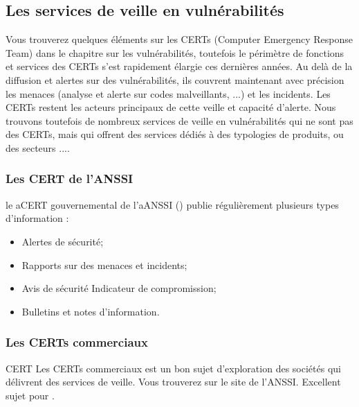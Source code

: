 \uchap{\jobname}

\subsection{Les services de veille en vulnérabilités}

Vous trouverez quelques éléments sur les CERTs (Computer Emergency Response Team) dans le chapitre sur les vulnérabilités, toutefois le périmètre de fonctions et services des CERTs s'est rapidement élargie ces dernières années. Au delà de la diffusion et alertes sur des vulnérabilités, ils couvrent maintenant avec précision les menaces (analyse et alerte sur codes malveillants, ...) et les incidents. Les CERTs restent les acteurs principaux de cette veille et capacité d'alerte.  
Nous trouvons toutefois de nombreux services de veille en vulnérabilités qui ne sont pas des CERTs, mais qui offrent des services dédiés à des typologies de produits, ou des secteurs ....

\subsubsection{Les CERT de l'ANSSI}


le \gls{aCERT} gouvernemental de l'\gls{aANSSI} () publie régulièrement plusieurs types d'information :

\begin{itemize}
  \item Alertes de sécurité;
  \item Rapports sur des menaces et incidents;
  \item Avis de sécurité Indicateur de compromission;
  \item Bulletins et notes d'information.
\end{itemize}



\subsubsection{Les CERTs commerciaux}

\begin{techworkbox}{CERT}
	Les CERTs commerciaux est un bon sujet d'exploration des sociétés qui délivrent des services de veille. Vous trouverez 
	 sur le site de l'ANSSI.  Excellent sujet pour \fichetech.
\end{techworkbox}

